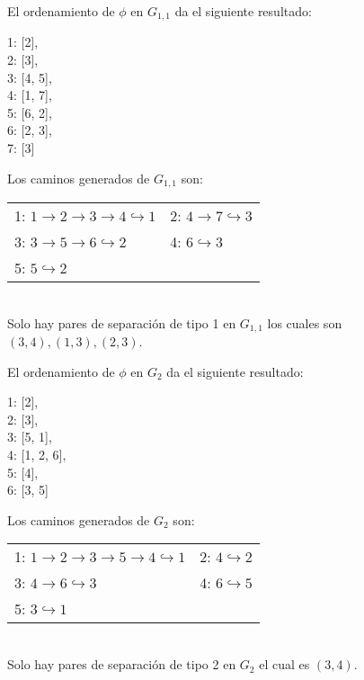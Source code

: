 El ordenamiento de $\phi$ en $G_{1, 1}$ da el siguiente resultado:
\begin{center}
1: [2],\\
2: [3],\\
3: [4, 5],\\
4: [1, 7],\\
5: [6, 2],\\
6: [2, 3],\\
7: [3]
\end{center}

Los caminos generados de $G_{1, 1}$ son:
\begin{tabular}[t]{ll}
1: $1 \rightarrow 2 \rightarrow 3 \rightarrow 4 \hookrightarrow 1$ & 2: $4 \rightarrow 7 \hookrightarrow 3$ \\
3: $3 \rightarrow 5 \rightarrow 6 \hookrightarrow 2$ & 4: $6 \hookrightarrow 3$\\
5: $5 \hookrightarrow 2$ & \\
\end{tabular}\\

Solo hay pares de separación de tipo 1 en $G_{1, 1}$ los cuales son $(3, 4), (1, 3), (2, 3)$.

El ordenamiento de $\phi$ en $G_{2}$ da el siguiente resultado:
\begin{center}
1: [2],\\ 
2: [3],\\ 
3: [5, 1],\\ 
4: [1, 2, 6],\\ 
5: [4],\\ 
6: [3, 5]
\end{center}

Los caminos generados de $G_{2}$ son:
\begin{tabular}[t]{ll}
1: $1 \rightarrow 2 \rightarrow 3 \rightarrow 5 \rightarrow 4 \hookrightarrow 1$ & 2: $4 \hookrightarrow 2$ \\
3: $4 \rightarrow 6 \hookrightarrow 3$ & 4: $6 \hookrightarrow 5$\\
5: $3 \hookrightarrow 1$ & \\
\end{tabular}\\

Solo hay pares de separación de tipo 2 en $G_{2}$ el cual es $(3, 4)$.

